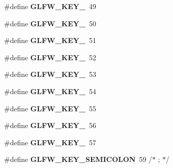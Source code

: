 \begin{DoxyCompactItemize}
\item 
\hypertarget{group__keys_ga05e4cae9ddb8d40cf6d82c8f11f2502f}{\#define {\bfseries \-G\-L\-F\-W\-\_\-\-K\-E\-Y\-\_}~49}\label{group__keys_ga05e4cae9ddb8d40cf6d82c8f11f2502f}

\item 
\hypertarget{group__keys_gadc8e66b3a4c4b5c39ad1305cf852863c}{\#define {\bfseries \-G\-L\-F\-W\-\_\-\-K\-E\-Y\-\_}~50}\label{group__keys_gadc8e66b3a4c4b5c39ad1305cf852863c}

\item 
\hypertarget{group__keys_ga812f0273fe1a981e1fa002ae73e92271}{\#define {\bfseries \-G\-L\-F\-W\-\_\-\-K\-E\-Y\-\_}~51}\label{group__keys_ga812f0273fe1a981e1fa002ae73e92271}

\item 
\hypertarget{group__keys_ga9e14b6975a9cc8f66cdd5cb3d3861356}{\#define {\bfseries \-G\-L\-F\-W\-\_\-\-K\-E\-Y\-\_}~52}\label{group__keys_ga9e14b6975a9cc8f66cdd5cb3d3861356}

\item 
\hypertarget{group__keys_ga4d74ddaa5d4c609993b4d4a15736c924}{\#define {\bfseries \-G\-L\-F\-W\-\_\-\-K\-E\-Y\-\_}~53}\label{group__keys_ga4d74ddaa5d4c609993b4d4a15736c924}

\item 
\hypertarget{group__keys_ga9ea4ab80c313a227b14d0a7c6f810b5d}{\#define {\bfseries \-G\-L\-F\-W\-\_\-\-K\-E\-Y\-\_}~54}\label{group__keys_ga9ea4ab80c313a227b14d0a7c6f810b5d}

\item 
\hypertarget{group__keys_gab79b1cfae7bd630cfc4604c1f263c666}{\#define {\bfseries \-G\-L\-F\-W\-\_\-\-K\-E\-Y\-\_}~55}\label{group__keys_gab79b1cfae7bd630cfc4604c1f263c666}

\item 
\hypertarget{group__keys_gadeaa109a0f9f5afc94fe4a108e686f6f}{\#define {\bfseries \-G\-L\-F\-W\-\_\-\-K\-E\-Y\-\_}~56}\label{group__keys_gadeaa109a0f9f5afc94fe4a108e686f6f}

\item 
\hypertarget{group__keys_ga2924cb5349ebbf97c8987f3521c44f39}{\#define {\bfseries \-G\-L\-F\-W\-\_\-\-K\-E\-Y\-\_}~57}\label{group__keys_ga2924cb5349ebbf97c8987f3521c44f39}

\item 
\hypertarget{group__keys_ga84233de9ee5bb3e8788a5aa07d80af7d}{\#define {\bfseries \-G\-L\-F\-W\-\_\-\-K\-E\-Y\-\_\-\-S\-E\-M\-I\-C\-O\-L\-O\-N}~59  /$\ast$ ; $\ast$/}\label{group__keys_ga84233de9ee5bb3e8788a5aa07d80af7d}


\end{DoxyCompactItemize}
